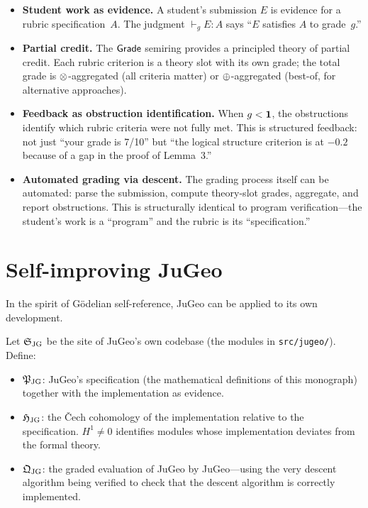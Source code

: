 \begin{itemize}
  \item \textbf{Student work as evidence.}\;
        A student's submission $E$ is evidence for a rubric
        specification~$A$.  The judgment
        $\vdash_g E : A$ says ``$E$ satisfies $A$ to grade~$g$\!.''
  \item \textbf{Partial credit.}\;
        The $\mathsf{Grade}$ semiring provides a principled theory of partial
        credit.  Each rubric criterion is a theory slot with its own
        grade; the total grade is $\otimes$-aggregated (all criteria
        matter) or $\oplus$-aggregated (best-of, for alternative
        approaches).
  \item \textbf{Feedback as obstruction identification.}\;
        When $g < \mathbf{1}$, the obstructions identify which
        rubric criteria were not fully met.  This is structured
        feedback: not just ``your grade is 7/10'' but ``the
        logical structure criterion is at $-0.2$ because of a gap
        in the proof of Lemma~3.''
  \item \textbf{Automated grading via descent.}\;
        The grading process itself can be automated:
        parse the submission, compute theory-slot grades, aggregate,
        and report obstructions.  This is structurally identical to
        program verification---the student's work is a ``program''
        and the rubric is its ``specification.''
\end{itemize}

\section{Self-improving JuGeo}
\label{sec:self-improving}

In the spirit of G\"odelian self-reference, JuGeo can be applied
to its own development.

\begin{construction}
\label{con:bootstrap}
Let $\mathfrak{S}_{\mathrm{JG}}$ be the site of JuGeo's own codebase
(the modules in \texttt{src/jugeo/}).  Define:
\begin{itemize}
  \item $\mathfrak{P}_{\mathrm{JG}}$: JuGeo's specification (the
        mathematical definitions of this monograph) together with
        the implementation as evidence.
  \item $\mathfrak{H}_{\mathrm{JG}}$: the \v{C}ech cohomology of the
        implementation relative to the specification.
        $H^1 \neq 0$ identifies modules whose implementation
        deviates from the formal theory.
  \item $\mathfrak{Q}_{\mathrm{JG}}$: the graded evaluation of JuGeo
        by JuGeo---using the very descent algorithm being verified
        to check that the descent algorithm is correctly
        implemented.
\end{itemize}
\end{construction}

